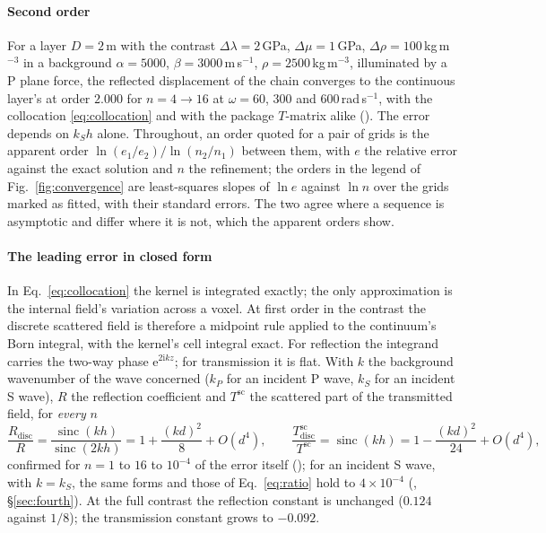 \documentclass[preprint,review,12pt]{elsarticle}
\newcommand{\sinc}{\operatorname{sinc}}
\begin{document}
\paragraph{Second order} For a layer $D=2$\,m with the contrast
$\Delta\lambda=2$\,GPa, $\Delta\mu=1$\,GPa, $\Delta\rho=100$\,kg\,m$^{-3}$ in a background
$\alpha=5000$, $\beta=3000$\,m\,s$^{-1}$, $\rho=2500$\,kg\,m$^{-3}$, illuminated by a P plane force,
the reflected displacement of the chain converges to the continuous layer's at order $2.000$ for
$n=4\to16$ at $\omega=60$, $300$ and $600$\,rad\,s$^{-1}$, with the collocation
\eqref{eq:collocation} and with the package $T$-matrix alike (). The
error depends on $k_Sh$ alone. Throughout, an order quoted for a pair of grids is the apparent order
$\ln(e_1/e_2)/\ln(n_2/n_1)$ between them, with $e$ the relative error against the exact solution
and $n$ the refinement; the orders in the legend of Fig.~\ref{fig:convergence} are least-squares
slopes of $\ln e$ against $\ln n$ over the grids marked as fitted, with their standard errors. The
two agree where a sequence is asymptotic and differ where it is not, which the apparent orders show.

\paragraph{The leading error in closed form} In Eq.~\eqref{eq:collocation} the kernel is
integrated exactly; the only approximation is the internal field's variation across a voxel. At
first order in the contrast the discrete scattered field is therefore a midpoint rule applied to
the continuum's Born integral, with the kernel's cell integral exact. For reflection the integrand
carries the two-way phase $\mathrm{e}^{2\mathrm{i}kz}$; for transmission it is flat. With $k$ the background
wavenumber of the wave concerned ($k_P$ for an incident P wave, $k_S$ for an incident S wave), $R$ the reflection coefficient and $T^{\text{sc}}$ the
scattered part of the transmitted field, for \emph{every} $n$
\begin{equation}\label{eq:errorR}
  \frac{R_{\text{disc}}}{R}=\frac{\sinc(kh)}{\sinc(2kh)}=1+\frac{(kd)^2}{8}+O(d^4),
  \qquad
  \frac{T^{\text{sc}}_{\text{disc}}}{T^{\text{sc}}}=\sinc(kh)=1-\frac{(kd)^2}{24}+O(d^4),
\end{equation}
confirmed for $n=1$ to $16$ to $10^{-4}$ of the error itself
(); for an incident S wave, with $k=k_S$, the same forms and those of
Eq.~\eqref{eq:ratio} hold to $4\times10^{-4}$ (, \S\ref{sec:fourth}). At the full contrast the reflection constant is unchanged
($0.124$ against $1/8$); the transmission constant grows to $-0.092$.
\end{document}
